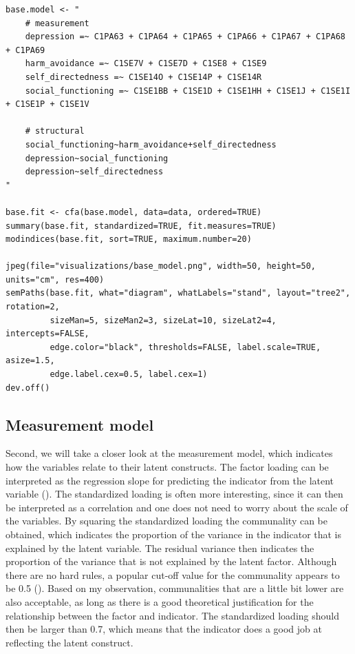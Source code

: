 \documentclass[11pt]{article}
\begin{document}
\begin{minipage}{\linewidth}
\begin{lstlisting}
base.model <- "
    # measurement
    depression =~ C1PA63 + C1PA64 + C1PA65 + C1PA66 + C1PA67 + C1PA68 + C1PA69
    harm_avoidance =~ C1SE7V + C1SE7D + C1SE8 + C1SE9
    self_directedness =~ C1SE14O + C1SE14P + C1SE14R
    social_functioning =~ C1SE1BB + C1SE1D + C1SE1HH + C1SE1J + C1SE1I + C1SE1P + C1SE1V

    # structural
    social_functioning~harm_avoidance+self_directedness
    depression~social_functioning
    depression~self_directedness
"

base.fit <- cfa(base.model, data=data, ordered=TRUE)
summary(base.fit, standardized=TRUE, fit.measures=TRUE)
modindices(base.fit, sort=TRUE, maximum.number=20)

jpeg(file="visualizations/base_model.png", width=50, height=50, units="cm", res=400)
semPaths(base.fit, what="diagram", whatLabels="stand", layout="tree2", rotation=2,
         sizeMan=5, sizeMan2=3, sizeLat=10, sizeLat2=4, intercepts=FALSE,
         edge.color="black", thresholds=FALSE, label.scale=TRUE, asize=1.5,
         edge.label.cex=0.5, label.cex=1)
dev.off()
\end{lstlisting}
\end{minipage}

\FloatBarrier
\subsection{Measurement model}

Second, we will take a closer look at the measurement model, which indicates
how the variables relate to their latent constructs. The factor loading can be
interpreted as the regression slope for predicting the indicator from the latent
variable (\cite{brown2015}). The standardized loading is often more interesting,
since it can then be interpreted as a correlation and one does not need to worry
about the scale of the variables. By squaring the standardized loading the
communality can be obtained, which indicates the proportion of the variance in
the indicator that is explained by the latent variable. The residual variance
then indicates the proportion of the variance that is not explained by the latent
factor. Although there are no hard rules, a popular cut-off value for the
communality appears to be 0.5 (\cite{hair2010}). Based on my observation,
communalities that are a little bit lower are also acceptable, as long as there
is a good theoretical justification for the relationship between the factor and
indicator. The standardized loading should then be larger than 0.7, which means
that the indicator does a good job at reflecting the latent construct.
\end{document}
